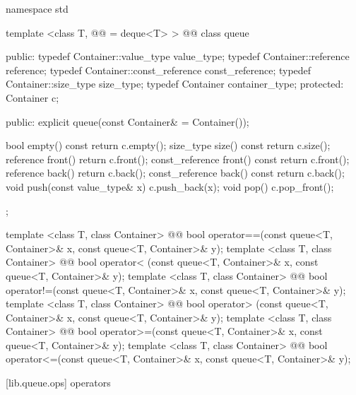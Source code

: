 \documentclass[american,twoside]{book}
\begin{document}
\begin{codeblock}
namespace std {
  template <class T, @@ = deque<T> >
  @@
  class queue {
  public:
    typedef Container::value_type            value_type;
    typedef Container::reference             reference;
    typedef Container::const_reference       const_reference;
    typedef Container::size_type             size_type;
    typedef Container                        container_type;
  protected:
    Container c;

  public:
    explicit queue(const Container& = Container());

    bool              empty() const     { return c.empty(); }
    size_type         size()  const     { return c.size(); }
    reference         front()           { return c.front(); }
    const_reference   front() const     { return c.front(); }
    reference         back()            { return c.back(); }
    const_reference   back() const      { return c.back(); }
    void push(const value_type& x)      { c.push_back(x); }
    void pop()                          { c.pop_front(); }
  };

  template <class T, class Container>
    @@
    bool operator==(const queue<T, Container>& x,
                    const queue<T, Container>& y);
  template <class T, class Container>
    @@
    bool operator< (const queue<T, Container>& x,
                    const queue<T, Container>& y);
  template <class T, class Container>
    @@
    bool operator!=(const queue<T, Container>& x,
                    const queue<T, Container>& y);
  template <class T, class Container>
    @@
    bool operator> (const queue<T, Container>& x,
                    const queue<T, Container>& y);
  template <class T, class Container>
    @@
    bool operator>=(const queue<T, Container>& x,
                    const queue<T, Container>& y);
  template <class T, class Container>
    @@
    bool operator<=(const queue<T, Container>& x,
                    const queue<T, Container>& y);
}
\end{codeblock}

[lib.queue.ops]{ operators}
\end{document}
